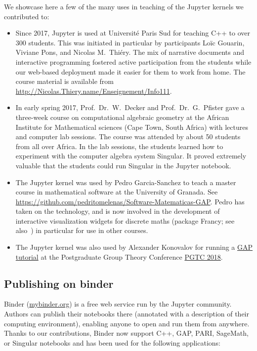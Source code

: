 \documentclass{deliverablereport}
\begin{document}
We showcase here a few of the many uses in teaching of the Jupyter
kernels we contributed to:
\begin{itemize}
\item Since 2017, Jupyter is used at Université Paris Sud for teaching C++ to over 300 students.
This was initiated in particular by \ODK participants Loïc Gouarin, Viviane Pons, and Nicolas M.\ Thiéry.
The mix of narrative documents and interactive programming fostered active participation from the students
while our web-based deployment made it easier for them to work from home.
The course material is available from \url{http://Nicolas.Thiery.name/Enseignement/Info111}.

\item In early spring 2017, Prof.~Dr.~W.~Decker and Prof.~Dr.~G.~Pfister gave a
three-week course on computational algebraic geometry at the
African Institute for Mathematical sciences (Cape Town, South Africa)
with lectures and computer lab sessions.
The course was attended by about 50 students from all over Africa.
In the lab sessions, the students learned how to experiment with the computer algebra system Singular.
It proved extremely valuable that the students could run Singular in the Jupyter notebook.

\item The \GAP Jupyter kernel was used by Pedro Garcia-Sanchez to teach
  a master course in mathematical software at the University of
  Granada. See
  \url{https://github.com/pedritomelenas/Software-Matematicas-GAP}.
  Pedro has taken on the technology, and is now involved in the
  development of interactive visualization widgets for discrete maths
  (package Francy; see also~)
  in particular for use in other courses.

\item The \GAP Jupyter kernel was also used by Alexander Konovalov for
  running a \href{https://github.com/alex-konovalov/gap-teaching/}{GAP
    tutorial} at the Postgraduate Group Theory Conference
  \href{http://www-groups.mcs.st-and.ac.uk/~pgtc2018/}{PGTC 2018}.
\end{itemize}

\subsection{Publishing on binder}

Binder (\url{mybinder.org}) is a free web service run by the Jupyter community.
Authors can publish their notebooks there (annotated with a description of their computing environment),
enabling anyone to open and run them from anywhere.
Thanks to our contributions, Binder now support C++, GAP, PARI,
SageMath, or Singular notebooks and has been used for the following
applications:
\end{document}
